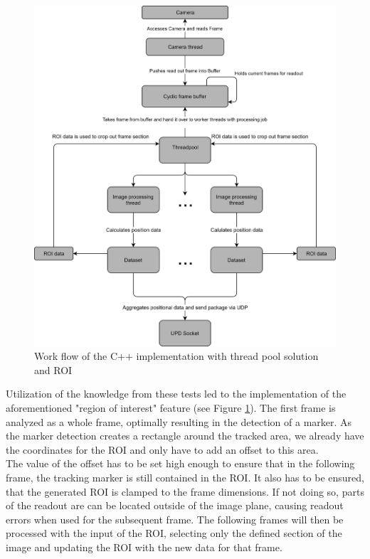 \begin{figure}[H]
\includegraphics[width=\textwidth]{images/pi_workflow_500.jpg}
\caption{Work flow of the C++ implementation with thread pool solution and ROI}
\label{c++ work flow map} 
\end{figure}
Utilization of the knowledge from these tests led to the implementation of the aforementioned "region of interest" feature (see Figure \ref{c++ work flow map}).
The first frame is analyzed as a whole frame, optimally resulting in the detection of a marker. As the marker detection creates a rectangle around the tracked area, we already have the coordinates for the ROI and only have to add an offset to this area.
\\The value of the offset has to be set high enough to ensure that in the following frame, the tracking marker is still contained in the ROI. It also has to be ensured, that the generated ROI is clamped to the frame dimensions. If not doing so, parts of the readout are can be located outside of the image plane, causing readout errors when used for the subsequent frame. The following frames will then be processed with the input of the ROI, selecting only the defined section of the image and updating the ROI with the new data for that frame.
